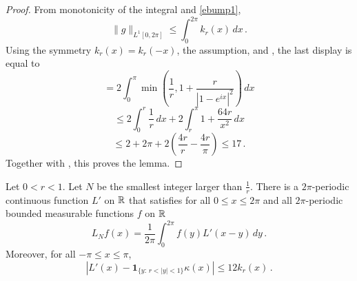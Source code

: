 \begin{proof}
\leanok
From monotonicity of the integral and \eqref{ebump1},
\begin{equation}
    \|g\|_{L^1[0, 2\pi]} \le \int_0^{2\pi}k_r(x)\, dx\,.
\end{equation}
Using the symmetry
$k_r(x)=k_r(-x)$, the assumption, and , the last display
is equal to
\begin{equation*}
    = 2 \int_0^\pi \min\left(\frac 1r, 1+\frac r{|1-e^{ix}|^2}\right)\, dx
\end{equation*}
\begin{equation*}
    \le 2\int_0^{r} \frac 1r \, dx+2\int_r^{\pi}1+\frac {64r}{x^2}\, dx
\end{equation*}
\begin{equation}
    \le 2+2\pi + 2\left(\frac {4r}r-\frac {4r}{\pi}\right)
    \le 17\, .
\end{equation}
    Together with , this proves the lemma.
\end{proof}

\begin{lemma}\label{Dirichlet-approximation}
\leanok
{}
Let $0<r<1$. Let $N$ be the smallest
integer larger than $\frac 1r$.
There is a $2\pi$-periodic continuous function
 ${L'}$ on ${\mathbb{R}}$ that satisfies for all $0\le x\le 2\pi$
and all $2\pi$-periodic bounded measurable functions $f$ on ${\mathbb{R}}$
\begin{equation}\label{lthroughlprime}
    L_Nf(x)=\frac 1{2\pi}\int_{0}^{2\pi}f(y) {L'}(x-y)\, dy\,.
\end{equation}
Moreover, for all $-\pi \le x \le \pi$,
\begin{equation}\label{eqdifflhil}
    \left|L'(x)-\mathbf{1}_{\{y:\, r<|y|<1\}} \kappa(x)\right|\le 12 k_r(x)\, .
\end{equation}
\end{lemma}


